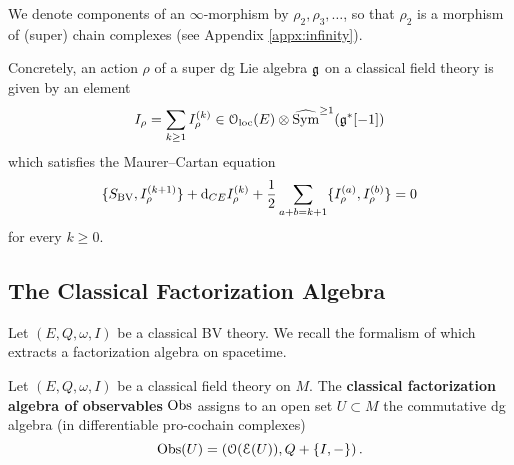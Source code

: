 \documentclass[10pt, oneside]{article}
\begin{document}
We denote components of an $\infty$-morphism by $\rho_2, \rho_3, \dots$, so that $\rho_2$ is a morphism of (super) chain complexes (see Appendix \ref{appx:infinity}).

Concretely, an action $\rho$ of a super dg Lie algebra $\mathfrak g$ on a classical field theory is given by an element
\[I_{\rho} = \sum_{k\geq 1} I_{\rho}^{(k)}\in \mathcal{O}_{\rm loc}(E)\otimes \widehat{\operatorname{Sym}}^{\geq 1}(\mathfrak g^*[-1])\]
which satisfies the Maurer--Cartan equation
\[\{S_{\mathrm{BV}}, I_\rho^{(k+1)}\} + {\rm d}_{CE} I_{\rho}^{(k)} + \frac{1}{2}\sum_{a+b=k+1} \{I_{\rho}^{(a)}, I_{\rho}^{(b)}\} = 0\]
for every $k\geq 0$.

\begin{definition}
\end{definition}

\begin{definition}
\end{definition}


\begin{remark}
\end{remark}


\subsection{The Classical Factorization Algebra}

Let $(E, Q, \omega, I)$ be a classical BV theory. We recall the formalism of \cite{Book1,Book2} which extracts a factorization algebra on spacetime.

\begin{definition}
Let $(E, Q, \omega, I)$ be a classical field theory on $M$. The {\bf classical factorization algebra of observables} $\mathrm{Obs}$ assigns to an open set $U \subset M$ the commutative dg algebra (in differentiable pro-cochain complexes)
\[
\mathrm{Obs}(U) = \left(\mathcal O(\mathcal E(U)) , Q + \{I,-\}\right) .
\]
\end{definition}
\end{document}
